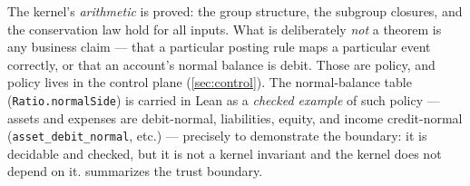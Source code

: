 The kernel's \emph{arithmetic} is proved: the group structure, the
subgroup closures, and the conservation law hold for all inputs. What is
deliberately \emph{not} a theorem is any business claim --- that a
particular posting rule maps a particular event correctly, or that an
account's normal balance is debit. Those are policy, and policy lives in
the control plane (\cref{sec:control}). The normal-balance table
(\texttt{Ratio.normalSide}) is carried in Lean as a \emph{checked example}
of such policy --- assets and expenses are debit-normal, liabilities,
equity, and income credit-normal (\texttt{asset\_debit\_normal}, etc.) ---
precisely to demonstrate the boundary: it is decidable and checked, but it
is not a kernel invariant and the kernel does not depend on it.
 summarizes the trust boundary.


